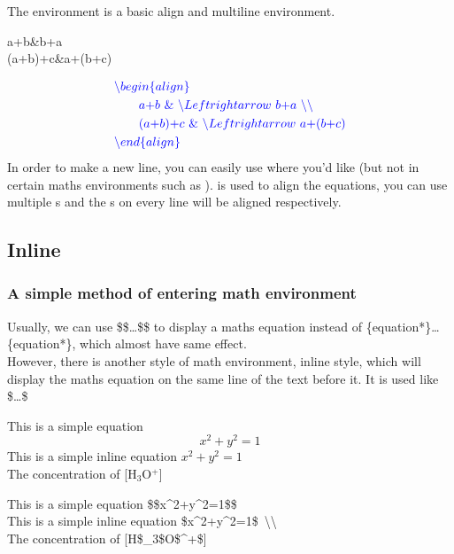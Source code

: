\begin{frame}
	The  environment is a basic align and multiline environment.\\
	\begin{example}
		\begin{flalign}
			a+b&\Leftrightarrow b+a\\
			(a+b)+c&\Leftrightarrow a+(b+c)
		\end{flalign}
	\end{example}
	\begin{align*}
		&\color{blue} \backslash begin\{align\}\\
		&\color{blue} \quad\quad a\text{+}b\ \&\ \backslash Leftrightarrow\ b\text{+}a\ \backslash\backslash \\
		&\color{blue} \quad\quad (a\text{+}b)\text{+}c\ \&\ \backslash Leftrightarrow\ a\text{+}(b\text{+}c)\\
		&\color{blue} \backslash end\{align\}
	\end{align*}
	In order to make a new line, you can easily use \structure{\textbackslash\textbackslash} where you'd like (but not in certain maths environments such as ). \structure{\&} is used to align the equations, you can use multiple \structure{\&}s and the \structure{\&}s on every line will be aligned respectively.
\end{frame}

\subsection{Inline}

\begin{frame}
	\frametitle{A simple method of entering math environment}
	Usually, we can use \alert{\$\$}\dots\alert{\$\$} to display a maths equation instead of \{equation*\}\dots{}\{equation*\}, which almost have same effect.\\[0.5em]
	However, there is another style of math environment, inline style, which will display the maths equation on the same line of the text before it. It is used like \alert{\$}\dots\alert{\$}
	\begin{example}
		This is a simple equation $$x^2+y^2=1$$
		This is a simple inline equation $x^2+y^2=1$	 \\
		The concentration of [H$_3$O$^+$]
	\end{example}
	This is a simple equation \alert{\$\$}x\^{}2+y\^{}2=1\alert{\$\$}\\
	This is a simple inline equation \alert{\$}x\^{}2+y\^{}2=1\alert{\$}\ \textbackslash\textbackslash\\
	The concentration of [H\alert{\$}\_3\$O\$\^{}+\alert{\$}]
\end{frame}

